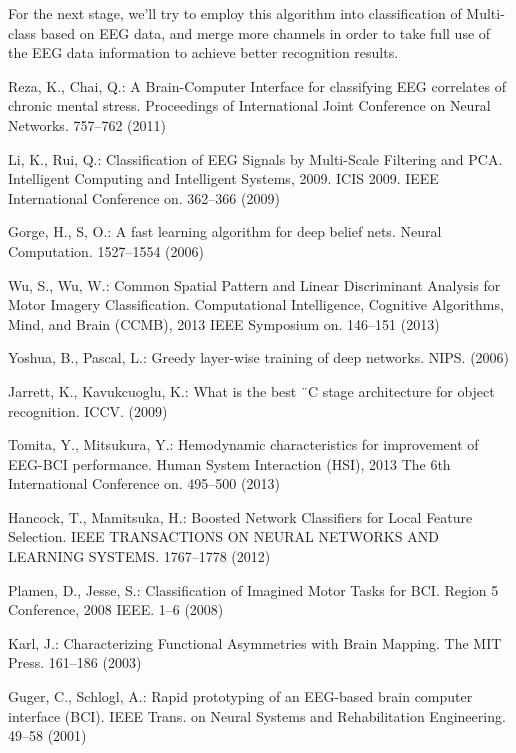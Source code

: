 \documentclass{llncs}
\begin{document}
For the next stage, we’ll try to employ this algorithm into classification of Multi-class based on EEG data, and merge more channels in order to take full use of the EEG data information to achieve better recognition results.



%
%
\begin{thebibliography}{}
%
Reza, K., Chai, Q.:
A Brain-Computer Interface for classifying EEG correlates of chronic mental stress.
Proceedings of International Joint Conference on Neural Networks. 757--762 (2011)

Li, K., Rui, Q.:
Classification of EEG Signals by Multi-Scale  Filtering and PCA.
Intelligent Computing and Intelligent Systems, 2009. ICIS 2009. IEEE International Conference on. 362--366 (2009)

Gorge, H., S, O.:
A fast learning algorithm for deep belief nets.
Neural Computation. 1527--1554 (2006)

Wu, S., Wu, W.:
Common Spatial Pattern and Linear Discriminant Analysis for Motor Imagery Classification.
Computational Intelligence, Cognitive Algorithms, Mind, and Brain (CCMB), 2013 IEEE Symposium on. 146--151 (2013)


Yoshua, B., Pascal, L.:
Greedy layer-wise training of deep networks.
NIPS. (2006)

Jarrett, K., Kavukcuoglu, K.:
What is the best ¨C  stage architecture for object recognition.
ICCV. (2009)

Tomita, Y., Mitsukura, Y.:
Hemodynamic characteristics for improvement of EEG-BCI performance.
Human System Interaction (HSI), 2013 The 6th International Conference on. 495--500 (2013)

Hancock, T., Mamitsuka, H.:
Boosted Network Classifiers for Local Feature Selection.
IEEE TRANSACTIONS ON NEURAL NETWORKS AND LEARNING SYSTEMS. 1767--1778 (2012)

Plamen, D., Jesse, S.:
Classification of Imagined Motor Tasks for BCI.
Region 5 Conference, 2008 IEEE. 1--6 (2008)

Karl, J.:
Characterizing  Functional Asymmetries with Brain Mapping.
The MIT Press. 161--186 (2003)

Guger, C., Schlogl, A.:
Rapid prototyping of an EEG-based brain computer interface (BCI).
IEEE Trans. on Neural Systems and Rehabilitation Engineering. 49--58 (2001)


\end{thebibliography}
\end{document}
